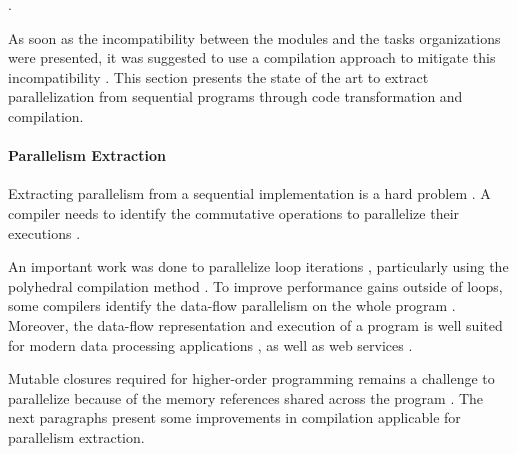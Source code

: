 .

As soon as the incompatibility between the modules and the tasks organizations were presented, it was suggested to use a compilation approach to mitigate this incompatibility \cite{Parnas1972}.
This section presents the state of the art to extract parallelization from sequential programs through code transformation and compilation.


\paragraph{Parallelism Extraction}

Extracting parallelism from a sequential implementation is a hard problem \cite{Johnston2004a}.
A compiler needs to identify the commutative operations to parallelize their executions \cite{Rinard1996,Clements2013a}.

An important work was done to parallelize loop iterations \cite{Mauras1989,Amarasinghe1995,Chen2008,Banerjee2013,Radoi2014}, particularly using the polyhedral compilation method \cite{Yuki2013,Grosser2011,Trifunovic2010,Bastoul2004}.
To improve performance gains outside of loops, some compilers identify the data-flow parallelism on the whole program \cite{Beck1991,Catanzaro2009,Li2012}.
Moreover, the data-flow representation and execution of a program is well suited for modern data processing applications \cite{Fernandez2014a}, as well as web services \cite{Salmito2013}.

Mutable closures required for higher-order programming remains a challenge to parallelize because of the memory references shared across the program \cite{Harrison1989, Nicolay2010, Matsakis2012a}.
The next paragraphs present some improvements in compilation applicable for parallelism extraction.

